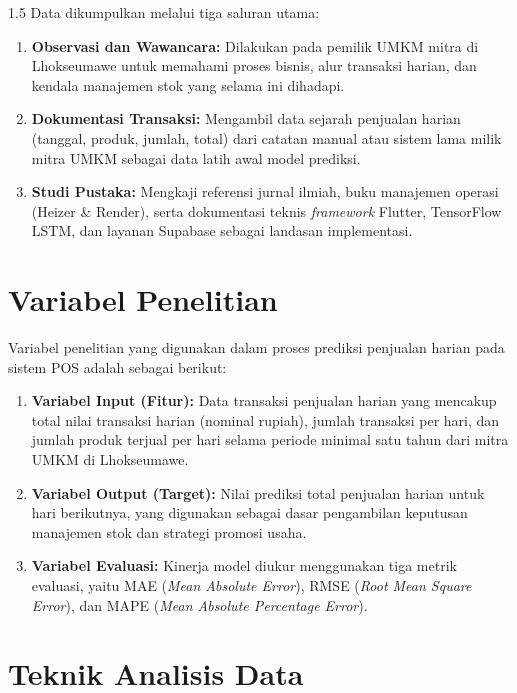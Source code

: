 \documentclass[12pt, a4paper, onecolumn, oneside]{report}
\begin{document}
\begin{spacing}{1.5}
Data dikumpulkan melalui tiga saluran utama:
\begin{enumerate}
    \item \textbf{Observasi dan Wawancara:} Dilakukan pada pemilik UMKM mitra di Lhokseumawe untuk memahami proses bisnis, alur transaksi harian, dan kendala manajemen stok yang selama ini dihadapi.
    \item \textbf{Dokumentasi Transaksi:} Mengambil data sejarah penjualan harian (tanggal, produk, jumlah, total) dari catatan manual atau sistem lama milik mitra UMKM sebagai data latih awal model prediksi.
    \item \textbf{Studi Pustaka:} Mengkaji referensi jurnal ilmiah, buku manajemen operasi (Heizer \& Render), serta dokumentasi teknis \textit{framework} Flutter, TensorFlow LSTM, dan layanan Supabase sebagai landasan implementasi.
\end{enumerate}

\section{Variabel Penelitian}

Variabel penelitian yang digunakan dalam proses prediksi penjualan harian pada sistem POS adalah sebagai berikut:
\begin{enumerate}
    \item \textbf{Variabel Input (Fitur):} Data transaksi penjualan harian yang mencakup total nilai transaksi harian (nominal rupiah), jumlah transaksi per hari, dan jumlah produk terjual per hari selama periode minimal satu tahun dari mitra UMKM di Lhokseumawe.
    \item \textbf{Variabel Output (Target):} Nilai prediksi total penjualan harian untuk hari berikutnya, yang digunakan sebagai dasar pengambilan keputusan manajemen stok dan strategi promosi usaha.
    \item \textbf{Variabel Evaluasi:} Kinerja model diukur menggunakan tiga metrik evaluasi, yaitu MAE (\textit{Mean Absolute Error}), RMSE (\textit{Root Mean Square Error}), dan MAPE (\textit{Mean Absolute Percentage Error}).
\end{enumerate}

\section{Teknik Analisis Data}


\end{spacing}
\end{document}
